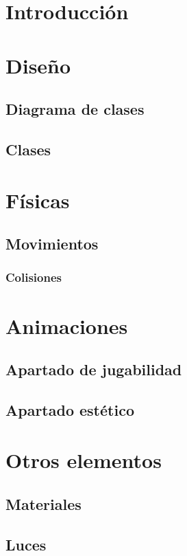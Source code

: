 \documentclass[11pt,a4paper]{article}
\begin{document}
\section{Introducción}

\section{Diseño}

\subsection{Diagrama de clases}
\subsection{Clases}

\section{Físicas}

\subsection{Movimientos}
\subsubsection{Colisiones}

\section{Animaciones}

\subsection{Apartado de jugabilidad}
\subsection{Apartado estético}

\section{Otros elementos}

\subsection{Materiales}
\subsection{Luces}
\end{document}
